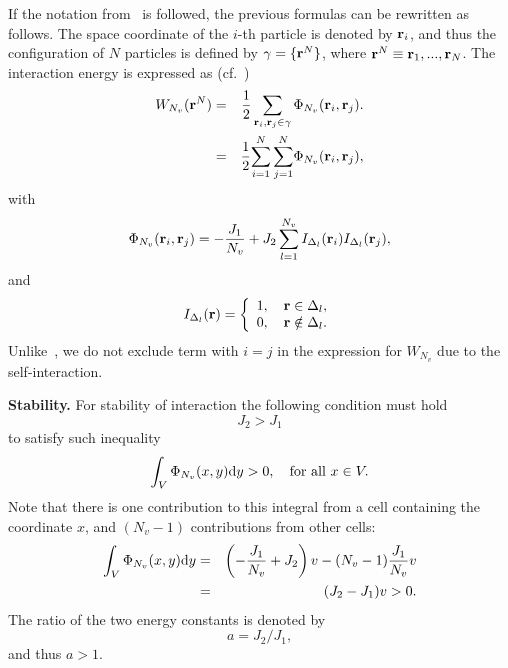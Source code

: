 \documentclass[12pt]{article}
\numberwithin{equation}{section}
\begin{document}
	\begin{mdframed}[linecolor=black,linewidth=1pt,leftline=true]
	If the notation from~\cite{HansenMcDonald13} is followed, the previous formulas can be rewritten as follows. The space coordinate of the $i$-th particle is denoted by $\vb{r}_i$, and thus the configuration of $N$ particles is defined by $\gamma = \{\vb{r}^N\}$, where $\vb{r}^N \equiv \vb{r}_1, ..., \vb{r}_N$. The interaction energy is expressed as (cf.~\cite[eq.~(2.5.16)]{HansenMcDonald13})
	\begin{eqnarray*}
		W_{N_v}(\vb{r}^N) & = & \frac{1}{2} \sum_{\vb{r}_i,\vb{r}_j \in \gamma} \Phi_{N_v} (\vb{r}_i,\vb{r}_j).
		\\
		& = & \frac12 {\sum_{i=1}^N \sum_{j=1}^N} \Phi_{N_v} (\vb{r}_i,\vb{r}_j),
	\end{eqnarray*}
	with
	\begin{equation*}
		\Phi_{N_v}(\vb{r}_i, \vb{r}_j) = -\frac{J_1}{N_v} + J_2\sum_{l=1}^{N_v} I_{\Delta_l}(\vb{r}_i) I_{\Delta_l}(\vb{r}_j),
	\end{equation*}
	and
	\begin{equation*}
		I_{\Delta_l} (\vb{r}) = \left\{
		\begin{array}{ll}
			1, \quad \vb{r} \in \Delta_l,
			\\
			0, \quad \vb{r} \notin \Delta_l.
		\end{array}
		\right.
	\end{equation*}
	Unlike~\cite[eq.~(2.5.16)]{HansenMcDonald13}, we do not exclude term with $i = j$ in the expression for $W_{N_v}$ due to the self-interaction.
	\end{mdframed}
	
	\textbf{Stability.} For stability of interaction the following condition must hold
	\begin{equation*}
		J_2 > J_1
	\end{equation*}
	to satisfy such inequality~\cite{KKD20,Ruelle70}
	\begin{equation}
		\int_{V} \Phi_{N_v}(x,y) {\rm d}y > 0, \quad \text{for all } x \in V.
	\end{equation}
	Note that there is one contribution to this integral from a cell containing the coordinate $x$, and $(N_v - 1)$ contributions from other cells:
	\begin{eqnarray*}
		\int_{V} \Phi_{N_v}(x,y) {\rm d}y & = & \left(-\frac{J_1}{N_v} + J_2\right)v - (N_v - 1) \frac{J_1}{N_v}v
		\\
		& = & (J_2 - J_1)v > 0.
	\end{eqnarray*} 
	The ratio of the two energy constants is denoted by
	$$a = J_2/J_1,$$
	and thus $a > 1.$
	
\end{document}
